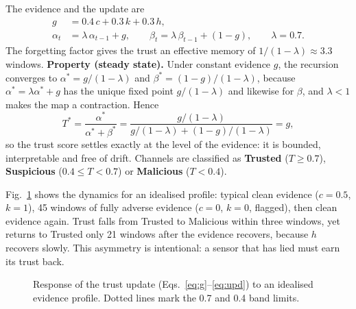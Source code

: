 \documentclass[11pt,a4paper]{article}
\begin{document}
The evidence and the update are
\begin{align}
g &= 0.4\,c + 0.3\,k + 0.3\,h, \label{eq:g}\\
\alpha_t &= \lambda\,\alpha_{t-1} + g, \qquad \beta_t = \lambda\,\beta_{t-1} + (1 - g), \qquad \lambda = 0.7. \label{eq:upd}
\end{align}
The forgetting factor gives the trust an effective memory of $1/(1-\lambda) \approx 3.3$ windows. \textbf{Property (steady state).} Under constant evidence $g$, the recursion converges to $\alpha^{*} = g/(1-\lambda)$ and $\beta^{*} = (1-g)/(1-\lambda)$, because $\alpha^{*} = \lambda\alpha^{*} + g$ has the unique fixed point $g/(1-\lambda)$ and likewise for $\beta$, and $\lambda < 1$ makes the map a contraction. Hence
\begin{equation}
T^{*} = \frac{\alpha^{*}}{\alpha^{*} + \beta^{*}} = \frac{g/(1-\lambda)}{g/(1-\lambda) + (1-g)/(1-\lambda)} = g,
\end{equation}
so the trust score settles exactly at the level of the evidence: it is bounded, interpretable and free of drift. Channels are classified as \textbf{Trusted} ($T \geq 0.7$), \textbf{Suspicious} ($0.4 \leq T < 0.7$) or \textbf{Malicious} ($T < 0.4$).

Fig.~\ref{fig:trust} shows the dynamics for an idealised profile: typical clean evidence ($c = 0.5$, $k = 1$), 45 windows of fully adverse evidence ($c = 0$, $k = 0$, flagged), then clean evidence again. Trust falls from Trusted to Malicious within three windows, yet returns to Trusted only 21 windows after the evidence recovers, because $h$ recovers slowly. This asymmetry is intentional: a sensor that has lied must earn its trust back.

\begin{figure}[H]
\centering
{}
\caption{Response of the trust update (Eqs.~\ref{eq:g}--\ref{eq:upd}) to an idealised evidence profile. Dotted lines mark the 0.7 and 0.4 band limits.}
\label{fig:trust}
\end{figure}
\end{document}
